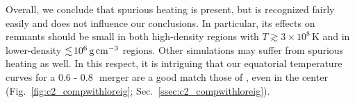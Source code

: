 
Overall, we conclude that spurious heating is present, but is recognized fairly easily and does not influence our conclusions.  In particular, its effects on remnants should be small in both high-density regions with $T\gtrsim3\times10^8$\,K and in lower-density $\lesssim\!10^6\,\gcc$ regions.  Other simulations may suffer from spurious heating as well.  In this respect, it is intriguing that our equatorial temperature curves for a 0.6 - 0.8\,\Msun\ merger are a good match those of , even in the center (Fig.~\ref{fig:c2_compwithloreig}; Sec.~\ref{ssec:c2_compwithloreig}).


